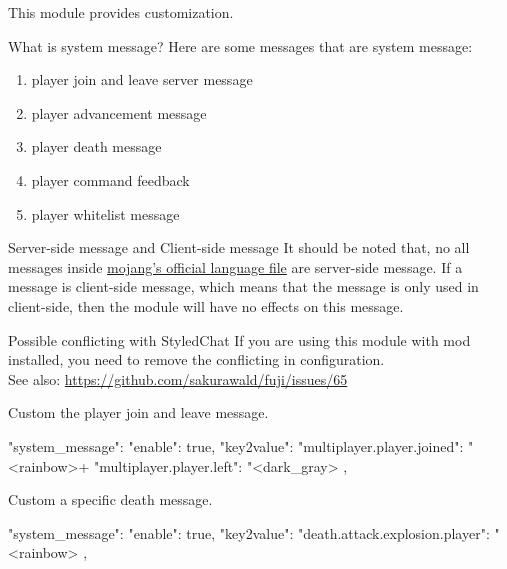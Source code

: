 
This module provides  customization.

\begin{note}{What is system message?}
    Here are some messages that are system message:
    \begin{enumerate}
        \item player join and leave server message
        \item player advancement message
        \item player death message
        \item player command feedback
        \item player whitelist message
    \end{enumerate}
\end{note}

\begin{note}{Server-side message and Client-side message}
    It should be noted that, no all messages inside \href{https://github.com/sakurawald/fuji/blob/dev/.github/files/en_us.json}{mojang's official language file} are server-side message.
    If a message is client-side message, which means that the message is only used in client-side, then the module will have no effects on this message.
\end{note}

\begin{warn}{Possible conflicting with StyledChat}
    If you are using this module with  mod installed, you need to remove the conflicting  in  configuration. \\
    See also: \url{https://github.com/sakurawald/fuji/issues/65}
\end{warn}


\begin{example}{Custom the player join and leave message.}
    \begin{json}
        "system_message": {
            "enable": true,
            "key2value": {
                "multiplayer.player.joined": "<rainbow>+ %
                "multiplayer.player.left": "<dark_gray>%
            }
        },
    \end{json}

\end{example}

\begin{example}{Custom a specific death message.}
    \begin{json}
        "system_message": {
            "enable": true,
            "key2value": {
                "death.attack.explosion.player": "<rainbow>%
            }
        },
    \end{json}
\end{example}

